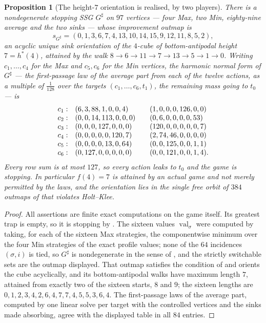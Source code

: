 \documentclass[11pt]{article}
\theoremstyle{plain}
\newtheorem{proposition}[theorem]{Proposition}
\theoremstyle{definition}
\DeclareMathOperator{\val}{val}
\begin{document}
\begin{proposition}[The height-$7$ orientation is realised, by two
players]\label{prop:auso-seven}
There is a nondegenerate stopping SSG $G^{\sharp}$ on $97$ vertices --- four
Max, two Min, eighty-nine average and the two sinks --- whose improvement
outmap is
\[
  s_{G^{\sharp}}=(0,1,3,6,7,4,13,10,14,15,9,12,11,8,5,2),
\]
an acyclic unique sink orientation of the $4$-cube of bottom-antipodal
height $7=h^{\ast}(4)$, attained by the walk
$8\to6\to11\to7\to13\to5\to1\to0$. Writing $c_1,\dots,c_4$ for the Max and
$c_5,c_6$ for the Min vertices, the harmonic normal form of $G^{\sharp}$
--- the first-passage law of the average part from each of the twelve
actions, as a multiple of $\tfrac1{128}$ over the targets
$(c_1,\dots,c_6,t_1)$, the remaining mass going to $t_0$ --- is
\[
 \begin{array}{r@{\quad}l@{\qquad}l}
  c_1: & (6,3,88,1,0,0,4)      & (1,0,0,0,126,0,0)\\
  c_2: & (0,0,14,113,0,0,0)    & (0,6,0,0,0,0,53)\\
  c_3: & (0,0,0,127,0,0,0)     & (120,0,0,0,0,0,7)\\
  c_4: & (0,0,0,0,0,120,7)     & (2,74,46,0,0,0,0)\\
  c_5: & (0,0,0,0,13,0,64)     & (0,0,125,0,0,1,1)\\
  c_6: & (0,127,0,0,0,0,0)     & (0,0,121,0,0,1,4).
 \end{array}
\]
Every row sum is at most $127$, so every action leaks to $t_0$ and the game
is stopping. In particular $f(4)=7$ is attained by an actual game and not
merely permitted by the laws, and the orientation lies in the single free
orbit of $384$ outmaps of  that violates Holt--Klee.
\end{proposition}

\begin{proof}
All assertions are finite exact computations on the game itself. Its
greatest trap is empty, so it is stopping by . The
sixteen values $\val_\sigma$ were computed by taking, for each of the
sixteen Max strategies, the componentwise minimum over the four Min
strategies of the exact profile values; none of the $64$ incidences
$(\sigma,i)$ is tied, so $G^{\sharp}$ is nondegenerate in the sense of
, and the strictly switchable sets are the
outmap displayed. That outmap satisfies the condition of
 and orients the cube acyclically, and its
bottom-antipodal walks have maximum length $7$, attained from exactly two
of the sixteen starts, $8$ and $9$; the sixteen lengths are
$0,1,2,3,4,2,6,4,7,7,4,5,5,3,6,4$. The first-passage laws of
the average part, computed by one linear solve per target with the
controlled vertices and the sinks made absorbing, agree with the displayed
table in all $84$ entries.
\end{proof}
\end{document}
